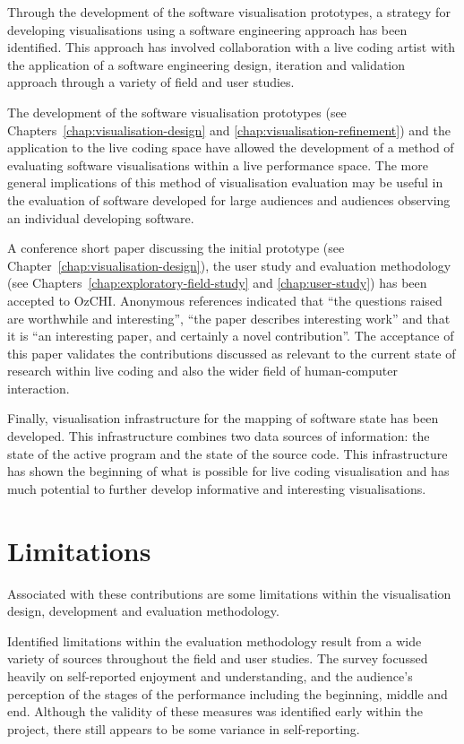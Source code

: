 Through the development of the software visualisation prototypes, a strategy for developing visualisations using a software engineering approach has been identified. This approach has involved collaboration with a live coding artist with the application of a software engineering design, iteration and validation approach through a variety of field and user studies.

The development of the software visualisation prototypes (see Chapters~\ref{chap:visualisation-design} and \ref{chap:visualisation-refinement}) and the application to the live coding space have allowed the development of a method of evaluating software visualisations within a live performance space. The more general implications of this method of visualisation evaluation may be useful in the evaluation of software developed for large audiences and audiences observing an individual developing software.

A conference short paper discussing the initial prototype (see Chapter~\ref{chap:visualisation-design}), the user study and evaluation methodology (see Chapters~\ref{chap:exploratory-field-study} and \ref{chap:user-study}) has been accepted to OzCHI. Anonymous references indicated that ``the questions raised are worthwhile and interesting'', ``the paper describes interesting work'' and that it is ``an interesting paper, and certainly a novel contribution''. The acceptance of this paper validates the contributions discussed as relevant to the current state of research within live coding and also the wider field of human-computer interaction.

Finally, visualisation infrastructure for the mapping of software state has been developed. This infrastructure combines two data sources of information: the state of the active program and the state of the source code. This infrastructure has shown the beginning of what is possible for live coding visualisation and has much potential to further develop informative and interesting visualisations.

\section{Limitations}

Associated with these contributions are some limitations within the visualisation design, development and evaluation methodology.

Identified limitations within the evaluation methodology result from a wide variety of sources throughout the field and user studies. The survey focussed heavily on self-reported enjoyment and understanding, and the audience's perception of the stages of the performance including the beginning, middle and end. Although the validity of these measures was identified early within the project, there still appears to be some variance in self-reporting.

